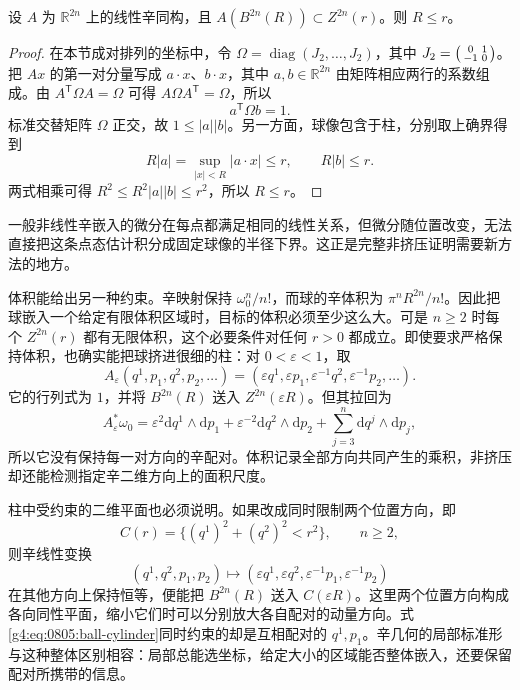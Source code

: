 \begin{proposition}\label{g4:prop:0805:linear-nonsqueezing}
	设 \(A\) 为 \(\mathbb R^{2n}\) 上的线性辛同构，且 \(A(B^{2n}(R))\subset Z^{2n}(r)\)。则 \(R\le r\)。
\end{proposition}
\begin{proof}
	在本节成对排列的坐标中，令 \(\Omega=\operatorname{diag}(J_2,\ldots,J_2)\)，其中 \(J_2=\begin{psmallmatrix}0&1\\-1&0\end{psmallmatrix}\)。把 \(Ax\) 的第一对分量写成 \(a\cdot x\)、\(b\cdot x\)，其中 \(a,b\in\mathbb R^{2n}\) 由矩阵相应两行的系数组成。由 \(A^{\mathsf T}\Omega A=\Omega\) 可得 \(A\Omega A^{\mathsf T}=\Omega\)，所以
	\[
		a^{\mathsf T}\Omega b=1.
	\]
	标准交替矩阵 \(\Omega\) 正交，故 \(1\le |a||b|\)。另一方面，球像包含于柱，分别取上确界得到
	\[
		R|a|=\sup_{|x|<R}|a\cdot x|\le r,
		\qquad R|b|\le r.
	\]
	两式相乘可得 \(R^2\le R^2|a||b|\le r^2\)，所以 \(R\le r\)。
\end{proof}

一般非线性辛嵌入的微分在每点都满足相同的线性关系，但微分随位置改变，无法直接把这条点态估计积分成固定球像的半径下界。这正是完整非挤压证明需要新方法的地方。

\ProseParagraphBreak

体积能给出另一种约束。辛映射保持 \(\omega_0^n/n!\)，而球的辛体积为 \(\pi^nR^{2n}/n!\)。因此把球嵌入一个给定有限体积区域时，目标的体积必须至少这么大。可是 \(n\ge2\) 时每个 \(Z^{2n}(r)\) 都有无限体积，这个必要条件对任何 \(r>0\) 都成立。即使要求严格保持体积，也确实能把球挤进很细的柱：对 \(0<\varepsilon<1\)，取
\[
	A_\varepsilon(q^1,p_1,q^2,p_2,\ldots)
	=(\varepsilon q^1,\varepsilon p_1,
	\varepsilon^{-1}q^2,\varepsilon^{-1}p_2,\ldots).
\]
它的行列式为 \(1\)，并将 \(B^{2n}(R)\) 送入 \(Z^{2n}(\varepsilon R)\)。但其拉回为
\[
	A_\varepsilon^*\omega_0
	=\varepsilon^2\mathrm{d}q^1\wedge\mathrm{d}p_1
	+\varepsilon^{-2}\mathrm{d}q^2\wedge\mathrm{d}p_2
	+\sum_{j=3}^n\mathrm{d}q^j\wedge\mathrm{d}p_j,
\]
所以它没有保持每一对方向的辛配对。体积记录全部方向共同产生的乘积，非挤压却还能检测指定辛二维方向上的面积尺度。

\ProseParagraphBreak

柱中受约束的二维平面也必须说明。如果改成同时限制两个位置方向，即
\[
	C(r)=\{(q^1)^2+(q^2)^2<r^2\},\qquad n\ge2,
\]
则辛线性变换
\[
	(q^1,q^2,p_1,p_2)\longmapsto
	(\varepsilon q^1,\varepsilon q^2,
	\varepsilon^{-1}p_1,\varepsilon^{-1}p_2)
\]
在其他方向上保持恒等，便能把 \(B^{2n}(R)\) 送入 \(C(\varepsilon R)\)。这里两个位置方向构成各向同性平面，缩小它们时可以分别放大各自配对的动量方向。式\eqref{g4:eq:0805:ball-cylinder}同时约束的却是互相配对的 \(q^1,p_1\)。辛几何的局部标准形与这种整体区别相容：局部总能选坐标，给定大小的区域能否整体嵌入，还要保留配对所携带的信息。
